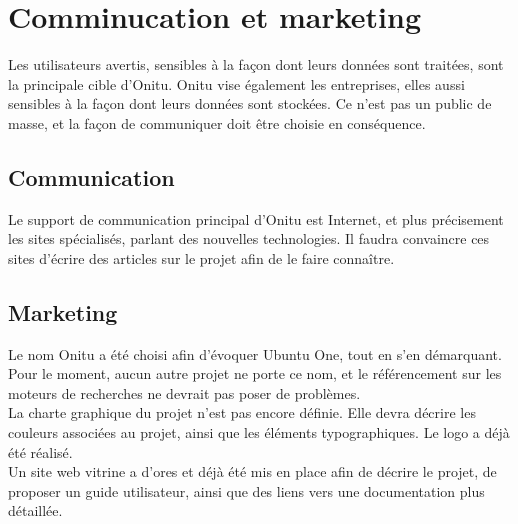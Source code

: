 \section{Comminucation et marketing}
Les utilisateurs avertis, sensibles à la façon dont leurs données sont traitées, sont la principale cible d'Onitu. Onitu vise également les entreprises, elles aussi sensibles à la façon dont leurs données sont stockées. Ce n'est pas un public de masse, et la façon de communiquer doit être choisie en conséquence.

\subsection{Communication}
Le support de communication principal d'Onitu est Internet, et plus précisement les sites spécialisés, parlant des nouvelles technologies. Il faudra convaincre ces sites d'écrire des articles sur le projet afin de le faire connaître.\\


\subsection{Marketing}
Le nom Onitu a été choisi afin d'évoquer Ubuntu One, tout en s'en démarquant. Pour le moment, aucun autre projet ne porte ce nom, et le référencement sur les moteurs de recherches ne devrait pas poser de problèmes.\\

La charte graphique du projet n'est pas encore définie. Elle devra décrire les couleurs associées au projet, ainsi que les éléments typographiques. Le logo a déjà été réalisé.\\

Un site web vitrine a d'ores et déjà été mis en place afin de décrire le projet, de proposer un guide utilisateur, ainsi que des liens vers une documentation plus détaillée.
